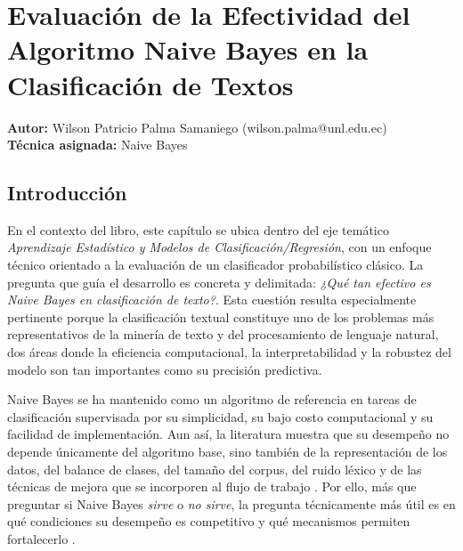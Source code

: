 
\setcounter{chapter}{3}
\chapter
  [Evaluación del algoritmo Naive Bayes]
  {Evaluación de la Efectividad del Algoritmo Naive Bayes en la Clasificación de Textos}
\label{cap:capitulo_04}

\textbf{Autor:} Wilson Patricio Palma Samaniego (wilson.palma@unl.edu.ec) \\
\textbf{Técnica asignada:} Naive Bayes \\

\section{Introducción}

En el contexto del libro, este capítulo se ubica dentro del eje temático \textit{Aprendizaje Estadístico y Modelos de Clasificación/Regresión}, con un enfoque técnico orientado a la evaluación de un clasificador probabilístico clásico. La pregunta que guía el desarrollo es concreta y delimitada: \textit{¿Qué tan efectivo es Naive Bayes en clasificación de texto?}. Esta cuestión resulta especialmente pertinente porque la clasificación textual constituye uno de los problemas más representativos de la minería de texto y del procesamiento de lenguaje natural, dos áreas donde la eficiencia computacional, la interpretabilidad y la robustez del modelo son tan importantes como su precisión predictiva.

Naive Bayes se ha mantenido como un algoritmo de referencia en tareas de clasificación supervisada por su simplicidad, su bajo costo computacional y su facilidad de implementación. Aun así, la literatura muestra que su desempeño no depende únicamente del algoritmo base, sino también de la representación de los datos, del balance de clases, del tamaño del corpus, del ruido léxico y de las técnicas de mejora que se incorporen al flujo de trabajo \cite{Kim2006,Frank2006,Kibriya2005,Schneider2005}. Por ello, más que preguntar si Naive Bayes \textit{sirve} o \textit{no sirve}, la pregunta técnicamente más útil es en qué condiciones su desempeño es competitivo y qué mecanismos permiten fortalecerlo \cite{Jiang2016,10.1145/2911451.2911547,Tang20161602}.


